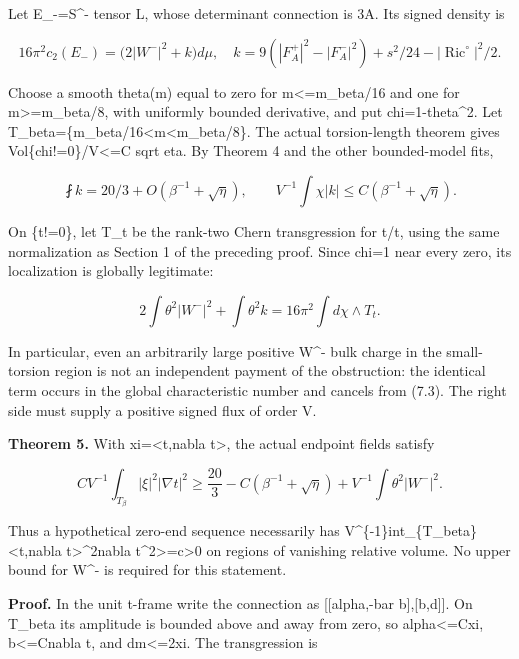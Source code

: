 \documentclass[
  10pt,
]{article}
\begin{document}
Let E\_-=S\^{}- tensor L, whose determinant connection is 3A. Its signed
density is

\[
 16\pi^2c_2(E_-)=\bigl(2|W^-|^2+k\bigr)d\mu,
\quad k=9(|F_A^+|^2-|F_A^-|^2)+s^2/24
                                      -|\operatorname{Ric}^{\circ}|^2/2.
                                                               \tag{7.1}
\]

Choose a smooth theta(m) equal to zero for m\textless=m\_beta/16 and one
for m\textgreater=m\_beta/8, with uniformly bounded derivative, and put
chi=1-theta\^{}2. Let
T\_beta=\{m\_beta/16\textless m\textless m\_beta/8\}. The actual
torsion-length theorem gives Vol\{chi!=0\}/V\textless=C sqrt eta. By
Theorem 4 and the other bounded-model fits,

\[
 \fint k=20/3+O(\beta^{-1}+\sqrt\eta),\qquad
 V^{-1}\int\chi|k|\le C(\beta^{-1}+\sqrt\eta).          \tag{7.2}
\]

On \{t!=0\}, let T\_t be the rank-two Chern transgression for
t/\textbar t\textbar, using the same normalization as Section 1 of the
preceding proof. Since chi=1 near every zero, its localization is
globally legitimate:

\[
 \boxed{2\int\theta^2|W^-|^2+\int\theta^2 k
                  =16\pi^2\int d\chi\wedge T_t.}       \tag{7.3}
\]

In particular, even an arbitrarily large positive W\^{}- bulk charge in
the small-torsion region is not an independent payment of the
obstruction: the identical term occurs in the global characteristic
number and cancels from (7.3). The right side must supply a positive
signed flux of order V.

\textbf{Theorem 5.} With xi=\textless t,nabla t\textgreater, the actual
endpoint fields satisfy

\[
 \boxed{C V^{-1}\int_{T_\beta}|\xi|^2|\nabla t|^2
    \ge\frac{20}{3}-C(\beta^{-1}+\sqrt\eta)
                          +V^{-1}\int\theta^2|W^-|^2.}          \tag{7.4}
\]

Thus a hypothetical zero-end sequence necessarily has
V\^{}\{-1\}int\_\{T\_beta\}\textbar\textless t,nabla
t\textgreater\textbar\^{}2\textbar nabla
t\textbar\^{}2\textgreater=c\textgreater0 on regions of vanishing
relative volume. No upper bound for W\^{}- is required for this
statement.

\textbf{Proof.} In the unit t-frame write the connection as
{[}{[}alpha,-bar b{]},{[}b,d{]}{]}. On T\_beta its amplitude is bounded
above and away from zero, so
\textbar alpha\textbar\textless=C\textbar xi\textbar,
\textbar b\textbar\textless=C\textbar nabla t\textbar, and
\textbar dm\textbar\textless=2\textbar xi\textbar. The transgression is
\end{document}

